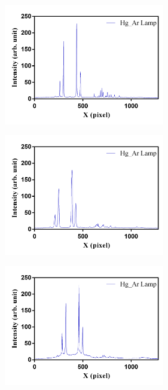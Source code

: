 \begin{figure}[H]
	\vspace{0.8cm}
	\centering
	\begin{subfigure}[fig nice]{0.49\textwidth}
		\setlength{\abovecaptionskip}{0.cm}
		\includegraphics[width=7cm]{figures/hg_Nice.png}
		\caption{}
		\label{fig:a}
	\end{subfigure}
\begin{subfigure}[fig nice]{0.49\textwidth}
	\setlength{\abovecaptionskip}{0.cm}
	\includegraphics[width=7cm]{figures/hg_HWHM_BAD.png}
	\caption{}
	\label{fig:b}
\end{subfigure}
\begin{subfigure}[fig a]{0.49\textwidth}
	\setlength{\abovecaptionskip}{0.cm}
	\includegraphics[width=7cm]{figures/hg_Baseline_bad.png}
	\caption{}
	\label{fig:c}
\end{subfigure}
\begin{subfigure}[fig b]{0.49\textwidth}

\end{subfigure}
\end{figure}
